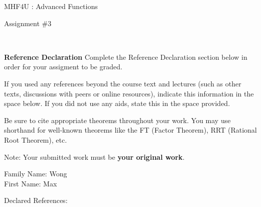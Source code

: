 \documentclass[12pt]{book}
\begin{document}
\vspace{-1.0in}\begin{center}
\Large{MHF4U :  Advanced Functions }

\Large{Assignment \#3}


\end{center}


\vspace{0.015in}\hrulefill\ 

\textbf{Reference Declaration} %
Complete the Reference Declaration section below in order for your assigment to be graded.

If you used any references beyond the course text and lectures (such as other texts, discussions with peers or online resources), indicate this information in the space below.  If you did not use any aids, state this in the space provided. 

Be sure to cite appropriate theorems throughout your work. You may use shorthand for well-known theorems like the FT (Factor Theorem), RRT (Rational Root Theorem), etc. 

Note: Your submitted work must be \textbf{your original work}. 

Family Name: Wong\\%
First Name: Max%

Declared References: 


\vspace{0.015in}\hrulefill\ 

\newpage

\end{document}
